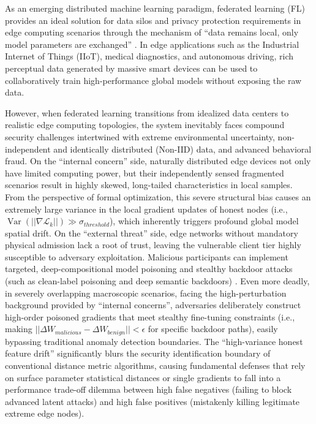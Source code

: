 \documentclass[runningheads]{llncs}
\begin{document}
As an emerging distributed machine learning paradigm, federated learning (FL) provides an ideal solution for data silos and privacy protection requirements in edge computing scenarios through the mechanism of ``data remains local, only model parameters are exchanged'' \cite{kairouz2021flsurvey}. In edge applications such as the Industrial Internet of Things (IIoT), medical diagnostics, and autonomous driving, rich perceptual data generated by massive smart devices can be used to collaboratively train high-performance global models without exposing the raw data.

However, when federated learning transitions from idealized data centers to realistic edge computing topologies, the system inevitably faces compound security challenges intertwined with extreme environmental uncertainty, non-independent and identically distributed (Non-IID) data, and advanced behavioral fraud. On the ``internal concern'' side, naturally distributed edge devices not only have limited computing power, but their independently sensed fragmented scenarios result in highly skewed, long-tailed characteristics in local samples. From the perspective of formal optimization, this severe structural bias causes an extremely large variance in the local gradient updates of honest nodes (i.e., $\operatorname{Var}(|| \nabla \mathcal{L}_k ||) \gg \sigma_{threshold}$), which inherently triggers profound global model spatial drift. On the ``external threat'' side, edge networks without mandatory physical admission lack a root of trust, leaving the vulnerable client tier highly susceptible to adversary exploitation. Malicious participants can implement targeted, deep-compositional model poisoning and stealthy backdoor attacks (such as clean-label poisoning and deep semantic backdoors) \cite{gu2017badnets,wang2019neuralcleanse}. Even more deadly, in severely overlapping macroscopic scenarios, facing the high-perturbation background provided by ``internal concerns'', adversaries deliberately construct high-order poisoned gradients that meet stealthy fine-tuning constraints (i.e., making $||\Delta W_{malicious} - \Delta W_{benign}|| < \epsilon$ for specific backdoor paths), easily bypassing traditional anomaly detection boundaries. The ``high-variance honest feature drift'' significantly blurs the security identification boundary of conventional distance metric algorithms, causing fundamental defenses that rely on surface parameter statistical distances or single gradients to fall into a performance trade-off dilemma between high false negatives (failing to block advanced latent attacks) and high false positives (mistakenly killing legitimate extreme edge nodes).
\end{document}
